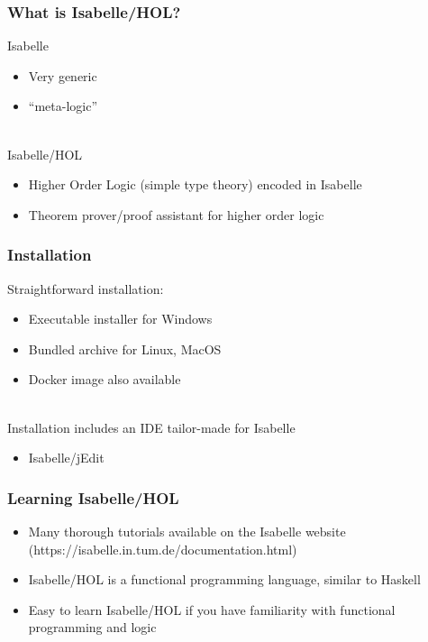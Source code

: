 \documentclass{beamer}
\begin{document}
  \begin{frame}
    \frametitle{What is Isabelle/HOL?}

    Isabelle
    \begin{itemize}
      \item Very generic
      \item ``meta-logic''\\~\

    \end{itemize}

    Isabelle/HOL
    \begin{itemize}
      \item Higher Order Logic (simple type theory) encoded in Isabelle
      \item Theorem prover/proof assistant for higher order logic
    \end{itemize}
  \end{frame}

  \begin{frame}
    \frametitle{Installation}
    Straightforward installation:
    \begin{itemize}
      \item Executable installer for Windows
      \item Bundled archive for Linux, MacOS
      \item Docker image also available\\~\

    \end{itemize}

    Installation includes an IDE tailor-made for Isabelle
    \begin{itemize}
      \item Isabelle/jEdit
    \end{itemize}
  \end{frame}

  \begin{frame}
    \frametitle{Learning Isabelle/HOL}
    \begin{itemize}
      \item Many thorough tutorials available on the Isabelle website
      (https://isabelle.in.tum.de/documentation.html)
      \item Isabelle/HOL is a functional programming language, similar to Haskell
      \item Easy to learn Isabelle/HOL if you have familiarity with functional
      programming and logic
    \end{itemize}
  \end{frame}
\end{document}
